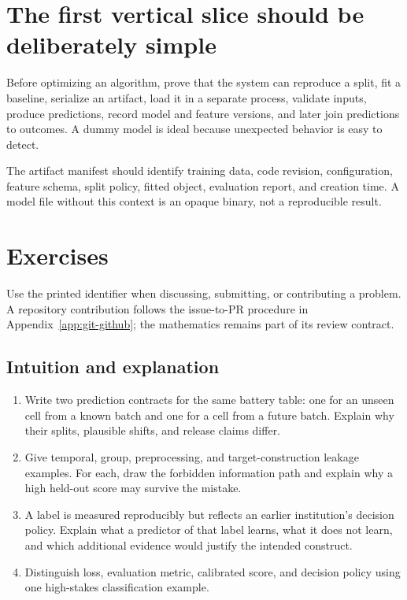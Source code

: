 \section{The first vertical slice should be deliberately simple}

Before optimizing an algorithm, prove that the system can reproduce a split,
fit a baseline, serialize an artifact, load it in a separate process, validate
inputs, produce predictions, record model and feature versions, and later join
predictions to outcomes. A dummy model is ideal because unexpected behavior is
easy to detect.

The artifact manifest should identify training data, code revision,
configuration, feature schema, split policy, fitted object, evaluation report,
and creation time. A model file without this context is an opaque binary, not a
reproducible result.

\section{Exercises}

Use the printed identifier when discussing, submitting, or contributing a
problem. A repository contribution follows the issue-to-PR procedure in
Appendix~\ref{app:git-github}; the mathematics remains part of its review
contract.

\subsection*{Intuition and explanation}

\begin{enumerate}[label=\textbf{SLC-I\arabic*.},leftmargin=*,itemsep=0.65em]
  \item Write two prediction contracts for the same battery table: one for an
  unseen cell from a known batch and one for a cell from a future batch. Explain
  why their splits, plausible shifts, and release claims differ.
  \item Give temporal, group, preprocessing, and target-construction leakage
  examples. For each, draw the forbidden information path and explain why a
  high held-out score may survive the mistake.
  \item A label is measured reproducibly but reflects an earlier institution's
  decision policy. Explain what a predictor of that label learns, what it does
  not learn, and which additional evidence would justify the intended construct.
  \item Distinguish loss, evaluation metric, calibrated score, and decision
  policy using one high-stakes classification example.
\end{enumerate}

